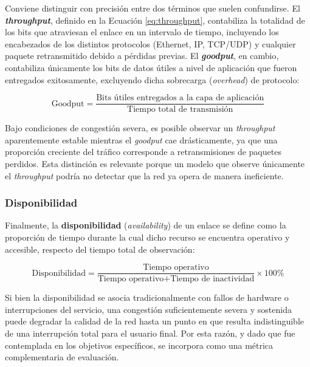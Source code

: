 \documentclass[12pt]{report}
\begin{document}
Conviene distinguir con precisión entre dos términos que suelen confundirse. El \textbf{\textit{throughput}}, definido en la Ecuación \ref{eq:throughput}, contabiliza la totalidad de los bits que atraviesan el enlace en un intervalo de tiempo, incluyendo los encabezados de los distintos protocolos (Ethernet, IP, TCP/UDP) y cualquier paquete retransmitido debido a pérdidas previas. El \textbf{\textit{goodput}}, 
en cambio, contabiliza únicamente los bits de datos útiles a nivel de aplicación que fueron entregados exitosamente, excluyendo dicha sobrecarga (\textit{overhead}) de protocolo:

\begin{equation}
    \text{Goodput} = \frac{\text{Bits útiles entregados a la capa de aplicación}}{\text{Tiempo total de transmisión}}
    \label{eq:goodput}
\end{equation}

Bajo condiciones de congestión severa, es posible observar un \textit{throughput} aparentemente estable mientras el \textit{goodput} cae drásticamente, ya que una proporción creciente del tráfico corresponde a retransmisiones de paquetes perdidos. Esta distinción es relevante porque un modelo que observe únicamente el \textit{throughput} podría no detectar que la red ya opera de manera ineficiente.

\subsubsection*{Disponibilidad}

Finalmente, la \textbf{disponibilidad} (\textit{availability}) de un enlace se define como la proporción de tiempo durante la cual dicho recurso se encuentra operativo y accesible, respecto del tiempo total de observación:

\begin{equation}
    \mbox{Disponibilidad} = \frac{\mbox{Tiempo operativo}}{\mbox{Tiempo operativo} + \mbox{Tiempo de inactividad}} \times 100\%
    \label{eq:disponibilidad}
\end{equation}

Si bien la disponibilidad se asocia tradicionalmente con fallos de hardware o interrupciones del servicio, una congestión suficientemente severa y sostenida puede degradar la calidad de la red hasta un punto en que resulta indistinguible de una interrupción total para el usuario final. Por esta razón, y dado que fue contemplada en los objetivos específicos, se incorpora como una métrica complementaria de evaluación.
\end{document}
